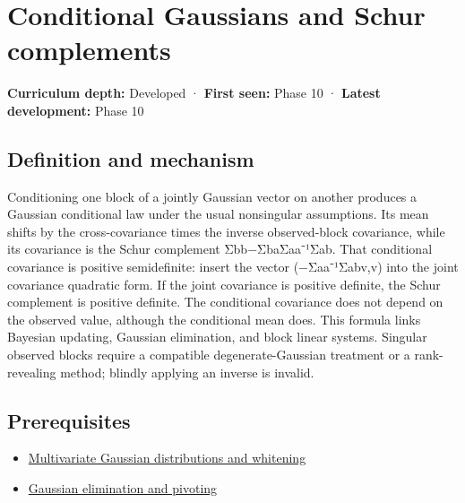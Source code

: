 \hypertarget{appendix-f0437ea55a47}{}\label{referencestart:appendix-f0437ea55a47}
\section{Conditional Gaussians and Schur complements}\label{appendix-f0437ea55a47-conditional-gaussians-and-schur-complements}

\hypertarget{appendix-f0437ea55a47-conditional-gaussians-and-schur-complements}{}

\textbf{Curriculum depth:} Developed · \textbf{First seen:} Phase 10 · \textbf{Latest development:} Phase 10

\begin{allmightroledefinition}

\subsection{Definition and mechanism}\label{appendix-f0437ea55a47-definition-and-mechanism}

\hypertarget{appendix-f0437ea55a47-definition-and-mechanism}{}

Conditioning one block of a jointly Gaussian vector on another produces a Gaussian conditional law under the usual nonsingular assumptions. Its mean shifts by the cross-covariance times the inverse observed-block covariance, while its covariance is the Schur complement Σbb−ΣbaΣaa⁻¹Σab. That conditional covariance is positive semidefinite: insert the vector (−Σaa⁻¹Σabv,v) into the joint covariance quadratic form. If the joint covariance is positive definite, the Schur complement is positive definite. The conditional covariance does not depend on the observed value, although the conditional mean does. This formula links Bayesian updating, Gaussian elimination, and block linear systems. Singular observed blocks require a compatible degenerate-Gaussian treatment or a rank-revealing method; blindly applying an inverse is invalid.

\end{allmightroledefinition}

\subsection{Prerequisites}\label{appendix-f0437ea55a47-prerequisites}

\hypertarget{appendix-f0437ea55a47-prerequisites}{}

\begin{itemize}
\tightlist
\item
  \hyperref[appendix-12bbe185dbe5]{Multivariate Gaussian distributions and whitening}
\item
  \hyperref[appendix-f6e77f4a200f]{Gaussian elimination and pivoting}
\end{itemize}


